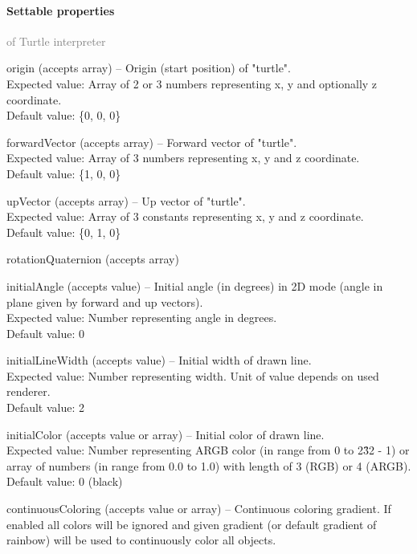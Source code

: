 	\paragraph{Settable properties}\textcolor{gray}{of Turtle interpreter}
	\begin{description*}
		\item[origin]
		(accepts array)
			-- Origin (start position) of "turtle".
			\\ Expected value: Array of 2 or 3 numbers representing x, y and optionally z coordinate.
			\\ Default value: \{0, 0, 0\}
		\item[forwardVector]
		(accepts array)
			-- Forward vector of "turtle".
			\\ Expected value: Array of 3 numbers representing x, y and z coordinate.
			\\ Default value: \{1, 0, 0\}
		\item[upVector]
		(accepts array)
			-- Up vector of "turtle".
			\\ Expected value: Array of 3 constants representing x, y and z coordinate.
			\\ Default value: \{0, 1, 0\}
		\item[rotationQuaternion]
		(accepts array)
		\item[initialAngle]
		(accepts value)
			-- Initial angle (in degrees) in 2D mode (angle in plane given by forward and up vectors).
			\\ Expected value: Number representing angle in degrees.
			\\ Default value: 0
		\item[initialLineWidth]
		(accepts value)
			-- Initial width of drawn line.
			\\ Expected value: Number representing width. Unit of value depends on used renderer.
			\\ Default value: 2
		\item[initialColor]
		(accepts value or array)
			-- Initial color of drawn line.
			\\ Expected value: Number representing ARGB color (in range from 0 to 2\^32 - 1) or array of numbers (in range from 0.0 to 1.0) with length of 3 (RGB) or 4 (ARGB).
			\\ Default value: 0 (black)
		\item[continuousColoring]
		(accepts value or array)
			-- Continuous coloring gradient.
            If enabled all colors will be ignored and given gradient (or default gradient of rainbow) will be used to continuously color all objects.

\end{description*}
